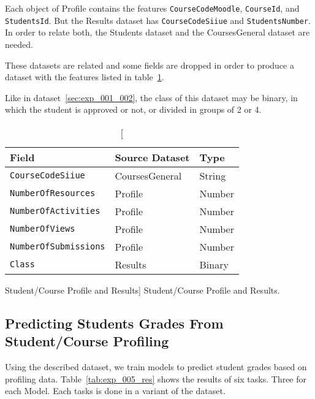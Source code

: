 Each object of Profile contains the features \texttt{CourseCodeMoodle},
\texttt{CourseId}, and \texttt{StudentsId}. But the Results dataset has
\texttt{CourseCodeSiiue} and \texttt{StudentsNumber}. In order to relate both,
the Students dataset and the CoursesGeneral dataset are needed.

These datasets are related and some fields are dropped in order to produce a
dataset with the features listed in table~\ref{tab:dat_003}.

Like in dataset~\ref{sec:exp_001_002}, the class of this dataset may be binary, in
which the student is approved or not, or divided in groups of 2 or 4.

\begin{table}[h!]
    \centering

    \begin{tabular}{| l | l | l |}
        \hline
        \textbf{Field}               & \textbf{Source Dataset} & \textbf{Type} \\ \hline
        \texttt{CourseCodeSiiue}     & CoursesGeneral          & String        \\ \hline
        \texttt{NumberOfResources}   & Profile                 & Number        \\ \hline
        \texttt{NumberOfActivities}  & Profile                 & Number        \\ \hline
        \texttt{NumberOfViews}       & Profile                 & Number        \\ \hline
        \texttt{NumberOfSubmissions} & Profile                 & Number        \\ \hline
        \texttt{Class}               & Results                 & Binary        \\ \hline
    \end{tabular}

    \caption
        [Student/Course Profile and Results]
        {Student/Course Profile and Results.}

    \label{tab:dat_003}
\end{table}

\subsection{Predicting Students Grades From Student/Course Profiling}

Using the described dataset, we train models to predict student grades based on
profiling data. Table~\ref{tab:exp_005_res} shows the results of six tasks.
Three for each Model. Each tasks is done in a variant of the dataset.

